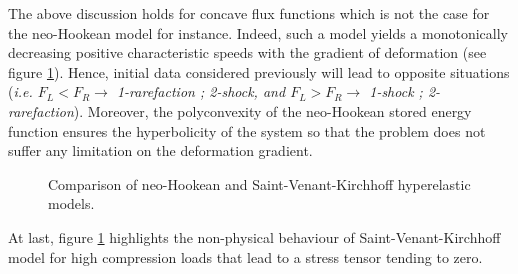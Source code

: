 \begin{remark} 
  The above discussion holds for concave flux functions which is not the case for the neo-Hookean model for instance. Indeed, such a model yields a monotonically decreasing positive characteristic speeds with the gradient of deformation (see figure \ref{fig:SVK-NH}). Hence, initial data considered previously will lead to opposite situations (\textit{i.e. $F_L<F_R \rightarrow $ 1-rarefaction ; 2-shock, and $F_L>F_R \rightarrow $ 1-shock ; 2-rarefaction}). Moreover, the polyconvexity of the neo-Hookean stored energy function ensures the hyperbolicity of the system so that the problem does not suffer any limitation on the deformation gradient.
  \begin{figure}[h]
    \centering
    \caption{Comparison of neo-Hookean and Saint-Venant-Kirchhoff hyperelastic models.}
    \label{fig:SVK-NH}
  \end{figure}
  At last, figure \ref{fig:SVK-NH} highlights the non-physical behaviour of Saint-Venant-Kirchhoff model for high compression loads that lead to a stress tensor tending to zero.
\end{remark}

